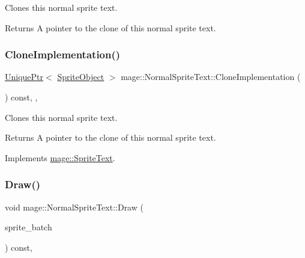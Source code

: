 Clones this normal sprite text.

\begin{DoxyReturn}{Returns}
A pointer to the clone of this normal sprite text. 
\end{DoxyReturn}
\hypertarget{classmage_1_1_normal_sprite_text_a261996eafdc02f39c6c57eb2b7ec2cea}{}\label{classmage_1_1_normal_sprite_text_a261996eafdc02f39c6c57eb2b7ec2cea} 
\subsubsection{\texorpdfstring{Clone\+Implementation()}{CloneImplementation()}}
{\footnotesize\ttfamily \hyperlink{namespacemage_a8c307fbcc33bce9b7f2aa4c26c3b95cf}{Unique\+Ptr}$<$ \hyperlink{classmage_1_1_sprite_object}{Sprite\+Object} $>$ mage\+::\+Normal\+Sprite\+Text\+::\+Clone\+Implementation (\begin{DoxyParamCaption}{ }\end{DoxyParamCaption}) const\hspace{0.3cm}{\ttfamily [override]}, {\ttfamily [private]}, {\ttfamily [virtual]}}

Clones this normal sprite text.

\begin{DoxyReturn}{Returns}
A pointer to the clone of this normal sprite text. 
\end{DoxyReturn}


Implements \hyperlink{classmage_1_1_sprite_text_a2b9f59a1730f8b9691f173251a2b4944}{mage\+::\+Sprite\+Text}.

\hypertarget{classmage_1_1_normal_sprite_text_ad2a1b02bea18afd6bf61b106a727a355}{}\label{classmage_1_1_normal_sprite_text_ad2a1b02bea18afd6bf61b106a727a355} 
\subsubsection{\texorpdfstring{Draw()}{Draw()}}
{\footnotesize\ttfamily void mage\+::\+Normal\+Sprite\+Text\+::\+Draw (\begin{DoxyParamCaption}\item[{Sprite\+Batch \&}]{sprite\+\_\+batch }\end{DoxyParamCaption}) const\hspace{0.3cm}{\ttfamily [override]}, {\ttfamily [virtual]}}

